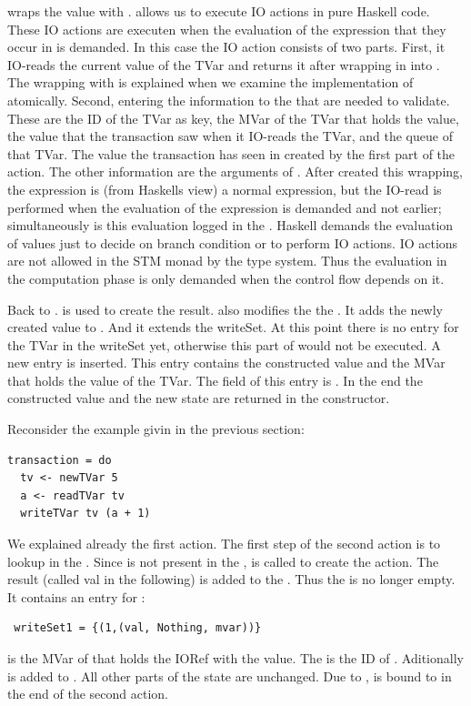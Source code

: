  wraps
the value with .  allows us to execute IO actions in pure
Haskell code. These IO actions are executen when the evaluation of the expression that they occur in 
is demanded. In this case the IO action consists of two parts. First, it IO-reads the 
current value of the TVar and returns it after wrapping in into . The wrapping with 
 is explained when we examine the implementation of atomically. Second, entering the 
information to the  that are needed to validate. These are the ID of the TVar as 
key, the MVar of the TVar that holds the value, the value that the transaction saw when it IO-reads
the TVar, and the queue of that TVar. The value the transaction has seen in created by the first 
part of the  action. The other information are the arguments of . After 
created this wrapping, the expression is (from Haskells view) a normal expression, but the IO-read is
performed when the evaluation of the expression is demanded and not earlier; simultaneously is this 
evaluation logged in the . Haskell demands the evaluation of values just to decide on
branch condition or to perform IO actions. IO actions are not allowed in the STM monad by the type
system. Thus the evaluation in the computation phase is only demanded when the control flow depends 
on it. 

Back to .  is used to create the result.  also modifies the 
the . It adds the newly created value to . And it extends the writeSet.
At this point there is no entry for the TVar in the writeSet yet, otherwise this part of 
would not be executed. A new entry is inserted. This entry contains the constructed value and 
the MVar that holds the value of the TVar. The  field of this entry is .
In the end the constructed value and the new state are returned in the  constructor.

Reconsider the example givin in the previous section:
\begin{lstlisting}
transaction = do 
  tv <- newTVar 5
  a <- readTVar tv
  writeTVar tv (a + 1)
\end{lstlisting}
We explained already the first action. The first step of the second action is to lookup 
in the . Since  is not present in the ,  is
called to create the  action. The result (called val in the 
following) is added to the . Thus the  is no longer empty. It contains 
an entry for :
\begin{lstlisting}
 writeSet1 = {(1,(val, Nothing, mvar))}
\end{lstlisting}
 is the MVar of  that holds the IORef with the value. The  is the
ID of . Aditionally is  
added to . All other parts of the state are unchanged. Due to \code{<-},  is 
bound to  in the end of the second action. 


